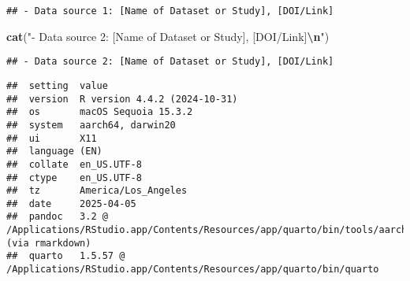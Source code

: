 \documentclass[
]{article}
\newenvironment{Shaded}{\begin{snugshade}}{\end{snugshade}}
\newcommand{\CommentTok}[1]{\textcolor[rgb]{0.56,0.35,0.01}{\textit{#1}}}
\newcommand{\DecValTok}[1]{\textcolor[rgb]{0.00,0.00,0.81}{#1}}
\newcommand{\FunctionTok}[1]{\textcolor[rgb]{0.13,0.29,0.53}{\textbf{#1}}}
\newcommand{\NormalTok}[1]{#1}
\newcommand{\OtherTok}[1]{\textcolor[rgb]{0.56,0.35,0.01}{#1}}
\newcommand{\SpecialCharTok}[1]{\textcolor[rgb]{0.81,0.36,0.00}{\textbf{#1}}}
\newcommand{\StringTok}[1]{\textcolor[rgb]{0.31,0.60,0.02}{#1}}
\begin{document}
\begin{verbatim}
## - Data source 1: [Name of Dataset or Study], [DOI/Link]
\end{verbatim}

\begin{Shaded}
\begin{Highlighting}[]
\FunctionTok{cat}\NormalTok{(}\StringTok{"{-} Data source 2: [Name of Dataset or Study], [DOI/Link]}\SpecialCharTok{\textbackslash{}n}\StringTok{"}\NormalTok{)}
\end{Highlighting}
\end{Shaded}

\begin{verbatim}
## - Data source 2: [Name of Dataset or Study], [DOI/Link]
\end{verbatim}

\begin{Shaded}
\end{Shaded}

\begin{verbatim}
##  setting  value
##  version  R version 4.4.2 (2024-10-31)
##  os       macOS Sequoia 15.3.2
##  system   aarch64, darwin20
##  ui       X11
##  language (EN)
##  collate  en_US.UTF-8
##  ctype    en_US.UTF-8
##  tz       America/Los_Angeles
##  date     2025-04-05
##  pandoc   3.2 @ /Applications/RStudio.app/Contents/Resources/app/quarto/bin/tools/aarch64/ (via rmarkdown)
##  quarto   1.5.57 @ /Applications/RStudio.app/Contents/Resources/app/quarto/bin/quarto
\end{verbatim}

\begin{Shaded}
\end{Shaded}
\end{document}
